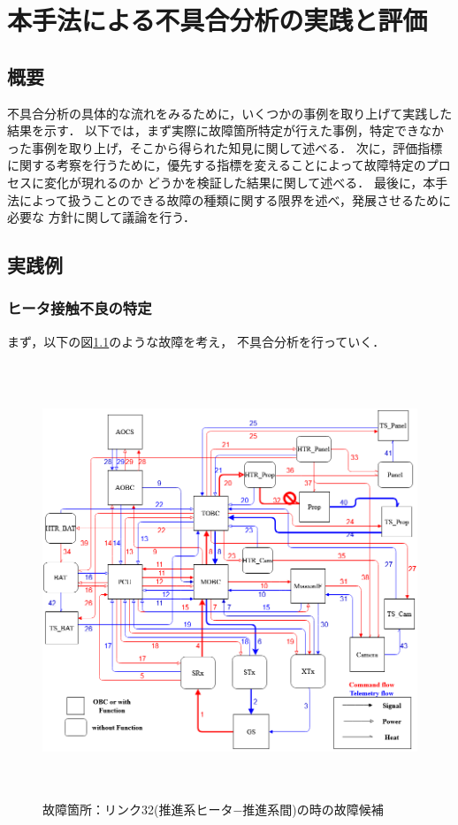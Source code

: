 \documentclass[11pt]{jsreport}
\begin{document}
\fi

\chapter{本手法による不具合分析の実践と評価}

\section{概要}
不具合分析の具体的な流れをみるために，いくつかの事例を取り上げて実践した結果を示す．
以下では，まず実際に故障箇所特定が行えた事例，特定できなかった事例を取り上げ，そこから得られた知見に関して述べる．
次に，評価指標に関する考察を行うために，優先する指標を変えることによって故障特定のプロセスに変化が現れるのか
どうかを検証した結果に関して述べる．
最後に，本手法によって扱うことのできる故障の種類に関する限界を述べ，発展させるために必要な
方針に関して議論を行う．

\section{実践例}

\subsection{ヒータ接触不良の特定}
まず，以下の図\ref{fig:fault_mode1}のような故障を考え，
不具合分析を行っていく．\\
\begin{figure}[H]
   \centering
      \includegraphics[height=13.0cm]{figure/fault_mode1.png}
      \caption{故障箇所：リンク32(推進系ヒータ−推進系間)の時の故障候補}
      \label{fig:fault_mode1}
\end{figure}
\end{document}

